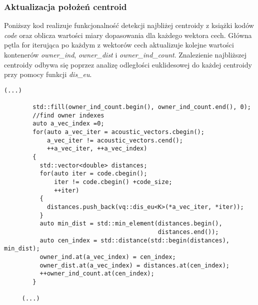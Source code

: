 \subsubsection{Aktualizacja położeń centroid}
Poniższy kod realizuje funkcjonalność detekcji najbliżej centroidy z książki kodów \textit{code} oraz oblicza wartości miary dopasowania dla każdego wektora cech. Główna pętla for iterująca po każdym z wektorów cech aktualizuje kolejne wartości kontenerów \textit{owner\_ind}, \textit{owner\_dist} i \textit{owner\_ind\_count}. Znalezienie najbliższej centroidy odbywa się poprzez analizę odległości euklidesowej do każdej centroidy przy pomocy funkcji \textit{dis\_eu}.
\begin{lstlisting}[style=lst:cpp, caption=Funkcja \textit{lbg}\label{lst:lbgbody4} - znalezienie najbliższej centroidy]
      (...)

        std::fill(owner_ind_count.begin(), owner_ind_count.end(), 0);
        //find owner indexes
        auto a_vec_index =0;
        for(auto a_vec_iter = acoustic_vectors.cbegin();
            a_vec_iter != acoustic_vectors.cend();
            ++a_vec_iter, ++a_vec_index)
        {
          std::vector<double> distances;
          for(auto iter = code.cbegin();
              iter != code.cbegin() +code_size;
              ++iter)
          {
            distances.push_back(vq::dis_eu<K>(*a_vec_iter, *iter));
          } 
          auto min_dist = std::min_element(distances.begin(),
                                           distances.end());
          auto cen_index = std::distance(std::begin(distances), min_dist);
          owner_ind.at(a_vec_index) = cen_index;
          owner_dist.at(a_vec_index) = distances.at(cen_index);
          ++owner_ind_count.at(cen_index);
        }

     (...)
\end{lstlisting}

